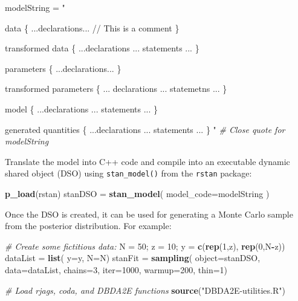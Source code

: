 \documentclass[
]{book}
\newenvironment{Shaded}{\begin{snugshade}}{\end{snugshade}}
\newcommand{\CommentTok}[1]{\textcolor[rgb]{0.56,0.35,0.01}{\textit{#1}}}
\newcommand{\DataTypeTok}[1]{\textcolor[rgb]{0.13,0.29,0.53}{#1}}
\newcommand{\DecValTok}[1]{\textcolor[rgb]{0.00,0.00,0.81}{#1}}
\newcommand{\KeywordTok}[1]{\textcolor[rgb]{0.13,0.29,0.53}{\textbf{#1}}}
\newcommand{\NormalTok}[1]{#1}
\newcommand{\OperatorTok}[1]{\textcolor[rgb]{0.81,0.36,0.00}{\textbf{#1}}}
\newcommand{\StringTok}[1]{\textcolor[rgb]{0.31,0.60,0.02}{#1}}
\begin{document}
\begin{Shaded}
\begin{Highlighting}[]
\NormalTok{modelString =}\StringTok{ "}

\StringTok{    data \{}
\StringTok{        ...declarations... // This is a comment}
\StringTok{    \}}

\StringTok{    transformed data \{}
\StringTok{        ...declarations ... statements ...}
\StringTok{    \}}

\StringTok{    parameters \{}
\StringTok{        ...declarations...}
\StringTok{    \}}

\StringTok{    transformed parameters \{}
\StringTok{        ... declarations ... statemetns ...}
\StringTok{    \}}

\StringTok{    model \{}
\StringTok{        ...declarations ... statements ...}
\StringTok{    \}}

\StringTok{    generated quantities \{}
\StringTok{        ...declarations ... statements ...}
\StringTok{    \}}
\StringTok{"} \CommentTok{# Close quote for modelString}
\end{Highlighting}
\end{Shaded}

Translate the model into C++ code and compile into an executable dynamic shared object (DSO) using \texttt{stan\_model()} from the \texttt{rstan} package:

\begin{Shaded}
\begin{Highlighting}[]
\KeywordTok{p_load}\NormalTok{(rstan)}
\NormalTok{stanDSO =}\StringTok{ }\KeywordTok{stan_model}\NormalTok{( }\DataTypeTok{model_code=}\NormalTok{modelString )}
\end{Highlighting}
\end{Shaded}

Once the DSO is created, it can be used for generating a Monte Carlo sample from the posterior distribution. For example:

\begin{Shaded}
\begin{Highlighting}[]
\CommentTok{# Create some fictitious data:}
\NormalTok{N =}\StringTok{ }\DecValTok{50}\NormalTok{; z =}\StringTok{ }\DecValTok{10}\NormalTok{; y =}\StringTok{ }\KeywordTok{c}\NormalTok{(}\KeywordTok{rep}\NormalTok{(}\DecValTok{1}\NormalTok{,z), }\KeywordTok{rep}\NormalTok{(}\DecValTok{0}\NormalTok{,N}\OperatorTok{-}\NormalTok{z))}
\NormalTok{dataList =}\StringTok{ }\KeywordTok{list}\NormalTok{( }\DataTypeTok{y=}\NormalTok{y, }\DataTypeTok{N=}\NormalTok{N)}
\NormalTok{stanFit =}\StringTok{ }\KeywordTok{sampling}\NormalTok{( }\DataTypeTok{object=}\NormalTok{stanDSO, }\DataTypeTok{data=}\NormalTok{dataList,}
                    \DataTypeTok{chains=}\DecValTok{3}\NormalTok{, }\DataTypeTok{iter=}\DecValTok{1000}\NormalTok{, }\DataTypeTok{warmup=}\DecValTok{200}\NormalTok{, }\DataTypeTok{thin=}\DecValTok{1}\NormalTok{)}

\CommentTok{# Load rjags, coda, and DBDA2E functions}
\KeywordTok{source}\NormalTok{(}\StringTok{"DBDA2E-utilities.R"}\NormalTok{)}
\end{Highlighting}
\end{Shaded}
\end{document}
